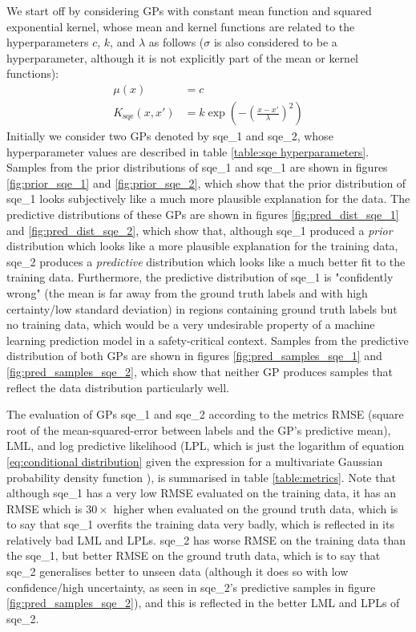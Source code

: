 We start off by considering GPs with constant mean function and squared exponential kernel, whose mean and kernel functions are related to the hyperparameters $c$, $k$, and $\lambda$ as follows ($\sigma$ is also considered to be a hyperparameter, although it is not explicitly part of the mean or kernel functions):
\begin{align}
\mu(x) &= c \\
K_{\text{sqe}}(x, x') &= k \exp\left( -\left( \frac{x - x'}{\lambda} \right)^2 \right) \label{eq:sqe kernel}
\end{align}
Initially we consider two GPs denoted by sqe\_1 and sqe\_2, whose hyperparameter values are described in table \ref{table:sqe hyperparameters}. Samples from the prior distributions of sqe\_1 and sqe\_1 are shown in figures \ref{fig:prior_sqe_1} and \ref{fig:prior_sqe_2}, which show that the prior distribution of sqe\_1 looks subjectively like a much more plausible explanation for the data. The predictive distributions of these GPs are shown in figures \ref{fig:pred_dist_sqe_1} and \ref{fig:pred_dist_sqe_2}, which show that, although sqe\_1 produced a \emph{prior} distribution which looks like a more plausible explanation for the training data, sqe\_2 produces a \emph{predictive} distribution which looks like a much better fit to the training data. Furthermore, the predictive distribution of sqe\_1 is "confidently wrong" (the mean is far away from the ground truth labels and with high certainty/low standard deviation) in regions containing ground truth labels but no training data, which would be a very undesirable property of a machine learning prediction model in a safety-critical context. Samples from the predictive distribution of both GPs are shown in figures \ref{fig:pred_samples_sqe_1} and \ref{fig:pred_samples_sqe_2}, which show that neither GP produces samples that reflect the data distribution particularly well.

The evaluation of GPs sqe\_1 and sqe\_2 according to the metrics RMSE (square root of the mean-squared-error between labels and the GP's predictive mean), LML, and log predictive likelihood (LPL, which is just the logarithm of equation \ref{eq:conditional distribution} given the expression for a multivariate Gaussian probability density function \cite{bishop2006pattern}), is summarised in table \ref{table:metrics}. Note that although sqe\_1 has a very low RMSE evaluated on the training data, it has an RMSE which is $30\times$ higher when evaluated on the ground truth data, which is to say that sqe\_1 overfits the training data very badly, which is reflected in its relatively bad LML and LPLs. sqe\_2 has worse RMSE on the training data than the sqe\_1, but better RMSE on the ground truth data, which is to say that sqe\_2 generalises better to unseen data (although it does so with low confidence/high uncertainty, as seen in sqe\_2's predictive samples in figure \ref{fig:pred_samples_sqe_2}), and this is reflected in the better LML and LPLs of sqe\_2.

